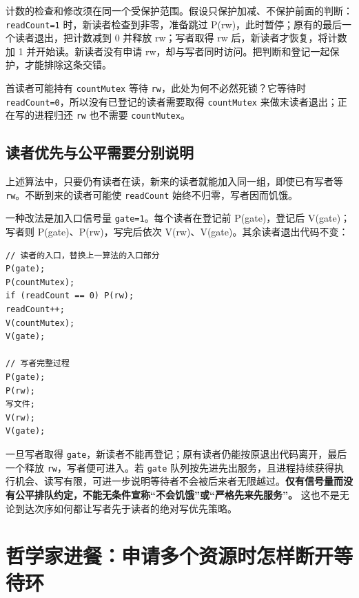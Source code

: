 计数的检查和修改须在同一个受保护范围。假设只保护加减、不保护前面的判断：\allowbreak{}\texttt{readCount=1} 时，新读者检查到非零，准备跳过 P(rw)，此时暂停；原有的最后一个读者退出，把计数减到 0 并释放 rw；写者取得 rw 后，新读者才恢复，将计数加 1 并开始读。新读者没有申请 rw，却与写者同时访问。把判断和登记一起保护，才能排除这条交错。

首读者可能持有 \allowbreak{}\texttt{countMutex} 等待 \allowbreak{}\texttt{rw}，此处为何不必然死锁？它等待时 \allowbreak{}\texttt{readCount=0}，所以没有已登记的读者需要取得 \allowbreak{}\texttt{countMutex} 来做末读者退出；正在写的进程归还 \allowbreak{}\texttt{rw} 也不需要 \allowbreak{}\texttt{countMutex}。

\subsection{读者优先与公平需要分别说明}\label{os-c03-h414}

上述算法中，只要仍有读者在读，新来的读者就能加入同一组，即使已有写者等 \allowbreak{}\texttt{rw}。不断到来的读者可能使 \allowbreak{}\texttt{readCount} 始终不归零，写者因而饥饿。

一种改法是加入口信号量 \allowbreak{}\texttt{gate=1}。每个读者在登记前 P(gate)，登记后 V(gate)；写者则 P(gate)、P(rw)，写完后依次 V(rw)、V(gate)。其余读者退出代码不变：

\par\medskip\noindent
\begin{minipage}{\linewidth}
\begin{verbatim}
// 读者的入口，替换上一算法的入口部分
P(gate);
P(countMutex);
if (readCount == 0) P(rw);
readCount++;
V(countMutex);
V(gate);

// 写者完整过程
P(gate);
P(rw);
写文件;
V(rw);
V(gate);
\end{verbatim}
\end{minipage}\par\medskip

一旦写者取得 \allowbreak{}\texttt{gate}，新读者不能再登记；原有读者仍能按原退出代码离开，最后一个释放 \allowbreak{}\texttt{rw}，写者便可进入。若 \allowbreak{}\texttt{gate} 队列按先进先出服务，且进程持续获得执行机会、读写有限，可进一步说明等待者不会被后来者无限越过。\textbf{仅有信号量而没有公平排队约定，不能无条件宣称``不会饥饿''或``严格先来先服务''。} 这也不是无论到达次序如何都让写者先于读者的绝对写优先策略。

\section{哲学家进餐：申请多个资源时怎样断开等待环}\label{sec-philosophers}

